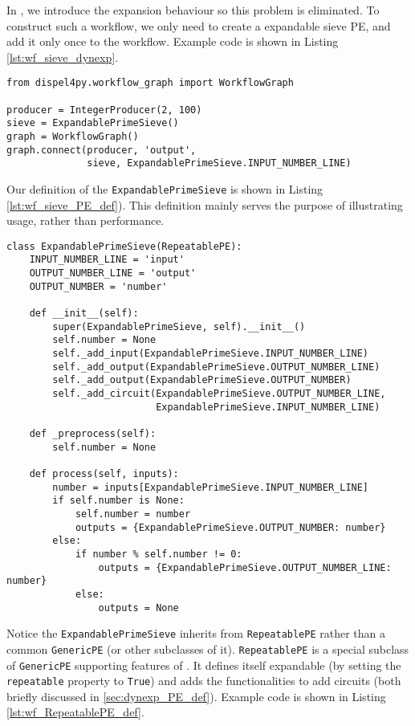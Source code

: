 In \tdynexp, we introduce the expansion behaviour so this problem is eliminated. To construct such a workflow, we only need to create a expandable sieve PE, and add it only once to the workflow. Example code is shown in Listing \ref{lst:wf_sieve_dynexp}.

\begin{lstlisting}[frame=single,caption={Example code of the sieve workflow construction in the new semantics (suppose IntegerProducer and ExpandablePrimeSieve are already defined)},captionpos=b,
label={lst:wf_sieve_dynexp}
]
from dispel4py.workflow_graph import WorkflowGraph

producer = IntegerProducer(2, 100)
sieve = ExpandablePrimeSieve()
graph = WorkflowGraph()
graph.connect(producer, 'output',
              sieve, ExpandablePrimeSieve.INPUT_NUMBER_LINE)
\end{lstlisting}

Our definition of the \lstinline|ExpandablePrimeSieve| is shown in Listing \ref{lst:wf_sieve_PE_def}). This definition mainly serves the purpose of illustrating usage, rather than performance.

\begin{lstlisting}[frame=single,caption={Example code of the ExpandablePrimeSieve class},captionpos=b,
label={lst:wf_sieve_PE_def}
]
class ExpandablePrimeSieve(RepeatablePE):
    INPUT_NUMBER_LINE = 'input'
    OUTPUT_NUMBER_LINE = 'output'
    OUTPUT_NUMBER = 'number'

    def __init__(self):
        super(ExpandablePrimeSieve, self).__init__()
        self.number = None
        self._add_input(ExpandablePrimeSieve.INPUT_NUMBER_LINE)
        self._add_output(ExpandablePrimeSieve.OUTPUT_NUMBER_LINE)
        self._add_output(ExpandablePrimeSieve.OUTPUT_NUMBER)
        self._add_circuit(ExpandablePrimeSieve.OUTPUT_NUMBER_LINE,
                          ExpandablePrimeSieve.INPUT_NUMBER_LINE)

    def _preprocess(self):
        self.number = None

    def process(self, inputs):
        number = inputs[ExpandablePrimeSieve.INPUT_NUMBER_LINE]
        if self.number is None:
            self.number = number
            outputs = {ExpandablePrimeSieve.OUTPUT_NUMBER: number}
        else:
            if number % self.number != 0:
                outputs = {ExpandablePrimeSieve.OUTPUT_NUMBER_LINE: number}
            else:
                outputs = None
\end{lstlisting}

Notice the \lstinline|ExpandablePrimeSieve| inherits from \lstinline|RepeatablePE| rather than a common \lstinline|GenericPE| (or other subclasses of it). \lstinline|RepeatablePE| is a special subclass of \lstinline|GenericPE| supporting features of \tdynexp. It defines itself expandable (by setting the \lstinline|repeatable| property to \lstinline|True|) and adds the functionalities to add circuits (both briefly discussed in \ref{sec:dynexp_PE_def}). Example code is shown in Listing \ref{lst:wf_RepeatablePE_def}.

